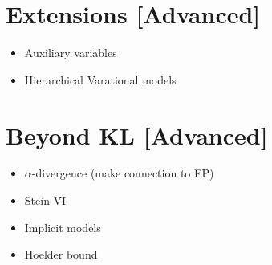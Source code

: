 \documentclass[11pt, a4paper]{article}
\begin{document}
\section{Extensions [Advanced]}
\begin{itemize}
\item Auxiliary variables
\item Hierarchical Varational models 
\end{itemize}

\section{Beyond KL [Advanced]}
\begin{itemize}
\item $ \alpha $-divergence (make connection to EP)
\item Stein VI
\item Implicit models
\item Hoelder bound
\end{itemize}
\end{document}

